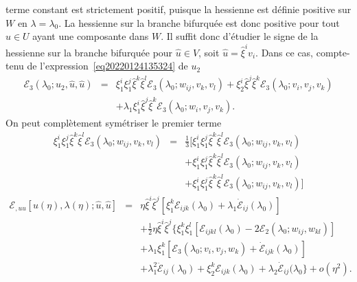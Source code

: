 \documentclass{article}
\newcommand{\nonconverted}[1]{\mbox{}}
\begin{document}
terme constant est strictement positif, puisque la hessienne est d{\'e}finie
positive sur $W$ en $\lambda = \lambda_0$. La hessienne sur la branche
bifurqu{\'e}e est donc positive pour tout $\hat{u} \in U$ ayant une composante
dans $W$. Il suffit donc d'{\'e}tudier le signe de la hessienne sur la branche
bifurqu{\'e}e pour $\hat{u} \in V$, soit $\hat{u} = \hat{\xi}^i v_i$. Dans ce
cas, compte-tenu de l'expression~\eqref{eq20220124135324} de $u_2$
\begin{eqnarray}
  \mathcal{E}_3 (\lambda_0 ; u_2, \hat{u}, \hat{u}) & = & \xi_1^i \xi_1^j
  \hat{\xi}^k  \hat{\xi}^l \mathcal{E}_3 (\lambda_0 ; w_{i  j}, v_k,
  v_l) + \xi_2^i  \hat{\xi}^j  \hat{\xi}^k \mathcal{E}_3 (\lambda_0 ; v_i,
  v_j, v_k) \nonumber\\
  &  & + \lambda_1 \xi_1^i  \hat{\xi}^j  \hat{\xi}^k \mathcal{E}_3 (\lambda_0
  ; w_i, v_j, v_k) .
\end{eqnarray}
On peut compl{\`e}tement sym{\'e}triser le premier terme
\begin{eqnarray}
  \xi_1^i \xi_1^j  \hat{\xi}^k  \hat{\xi}^l \mathcal{E}_3 (\lambda_0 ; w_{i
   j}, v_k, v_l) & = & \tfrac{1}{3} [\xi_1^i \xi_1^j  \hat{\xi}^k
  \hat{\xi}^l \mathcal{E}_3 (\lambda_0 ; w_{i  j}, v_k, v_l)
   \nonumber\\
  &  & + \xi_1^i \xi_1^j  \hat{\xi}^k  \hat{\xi}^l \mathcal{E}_3 (\lambda_0 ;
  w_{i  j}, v_k, v_l) \nonumber\\
  &  &  + \xi_1^i \xi_1^j  \hat{\xi}^k  \hat{\xi}^l \mathcal{E}_3
  (\lambda_0 ; w_{i  j}, v_k, v_l)]
\end{eqnarray}
\begin{eqnarray}
  \mathcal{E}_{, u  u} [u (\eta), \lambda (\eta) ; \hat{u}, \hat{u}] &
  = & \eta \hat{\xi}^i  \hat{\xi}^j  [\xi_1^k \mathcal{E}_{i  j
   k} (\lambda_0) + \lambda_1  \dot{\mathcal{E}}_{i  j}
  (\lambda_0)] \nonumber\\
  &  & + \tfrac{1}{2} \eta \nonconverted{twosuperior} \hat{\xi}^i
  \hat{\xi}^j  \{ \xi_1^k \xi_1^l  [\mathcal{E}_{i  j  k
   l} (\lambda_0) - 2\mathcal{E}_2 (\lambda_0 ; w_{i  j}, w_{k
   l})]  \nonumber\\
  &  & + \lambda_1 \xi_1^k  [\mathcal{E}_3 (\lambda_0 ; v_i, v_j, w_k) +
  \dot{\mathcal{E}}_{i  j  k} (\lambda_0)] \nonumber\\
  &  & + \lambda_1^2  \ddot{\mathcal{E}}_{i  j} (\lambda_0) + \xi_2^k
  \mathcal{E}_{i  j  k} (\lambda_0) + \lambda_2
  \dot{\mathcal{E}}_{i  j} (\lambda_0 \} + o (\eta^2) .
  \label{eq20220203144500}
\end{eqnarray}
\end{document}
